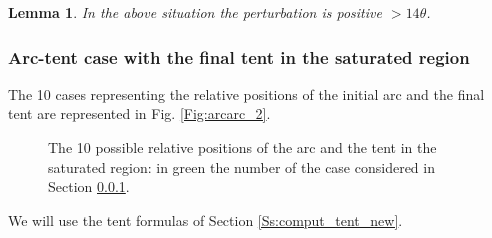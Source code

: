 \documentclass[reqno]{amsart}
\theoremstyle{definition} \newtheorem{definition}{Definition}[section]
\theoremstyle{definition} \newtheorem{remark}[definition]{Remark}
\theoremstyle{plain} \newtheorem{lemma}[definition]{Lemma}
\theoremstyle{plain} \newtheorem{proposition}[definition]{Proposition}
\theoremstyle{plain} \newtheorem{theorem}[definition]{Theorem}
\theoremstyle{plain} \newtheorem{corollary}[definition]{Corollary}
\theoremstyle{definition} \newtheorem{example}[definition]{Example}
\theoremstyle{plain} \newtheorem{claim}[clai]{Claim}
\theoremstyle{definition} \newtheorem{assumption}[definition]{Assumption}
\theoremstyle{definition} \newtheorem{observation}[definition]{Observation}
\newcommand{\1}{\mathbbm 1}
\numberwithin{equation}{section} %
\theoremstyle{plain} \newtheorem*{theorem*}{Theorem}
\theoremstyle{plain} \newtheorem{mthm}[maintheorem]{Main Theorem}
\theoremstyle{plain} \newtheorem*{mthm*}{Main Theorem}
\theoremstyle{plain} \newtheorem*{conjecture*}{Conjecture}
\theoremstyle{plain} \newtheorem{conjecture}[definition]{Conjecture}
\theoremstyle{plain} \newtheorem*{problem*}{Problem}
\begin{document}
\begin{lemma}
\label{Lem:arc_segm_1}
In the above situation the perturbation is positive $> 14 \theta$.
\end{lemma}


\subsubsection{Arc-tent case with the final tent in the saturated region}
\label{Sss:arc_tent_satur}


The 10 cases representing the relative positions of the initial arc and the final tent are represented in Fig. \ref{Fig:arcarc_2}.

\begin{figure}
\resizebox{.75\textwidth}{!}{}
\caption{The 10 possible relative positions of the arc and the tent in the saturated region: in green the number of the case considered in Section \ref{Sss:arc_tent_satur}.}
\label{Fig:arc_segm_2}
\end{figure}

We will use the tent formulas of Section \ref{Ss:comput_tent_new}.
\end{document}
